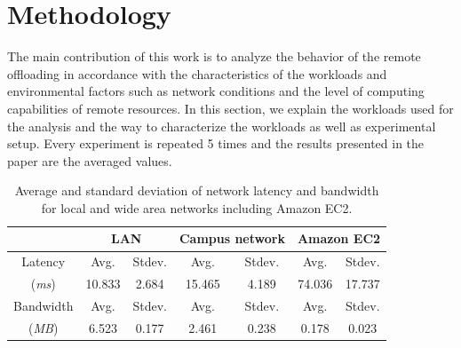 \documentclass[conference]{IEEEtran}
\begin{document}
\section{Methodology}
The main contribution of this work is to analyze the behavior of the
remote offloading in accordance with the characteristics of the
workloads and environmental factors such as network conditions and the
level of computing capabilities of remote resources.
%
In this section, we explain the workloads used for the analysis and the
way to characterize the workloads as well as experimental setup.
%
Every experiment is repeated 5 times and the results presented in the
paper are the averaged values.
%
\begin{table}
\centering
\caption{Average and standard deviation of network latency and bandwidth
for local and wide area networks including Amazon EC2.}
	\begin{tabular}{c|cc|cc|cc}
	\hline\hline
	\ & \multicolumn{2}{c|}{LAN} & \multicolumn{2}{c|}{Campus network} &
\multicolumn{2}{c}{Amazon EC2} \\
	\hline\hline
	Latency & Avg. & Stdev. & Avg. & Stdev. & Avg. & Stdev.\\
	(\textit{ms}) & 10.833 & 2.684 & 15.465 & 4.189 & 74.036 & 17.737 \\
	\hline 
	Bandwidth & Avg. & Stdev. & Avg. & Stdev. & Avg. & Stdev. \\
    (\textit{MB}) & 6.523 & 0.177 & 2.461 & 0.238 & 0.178 & 0.023 \\ \hline
	\end{tabular}
\end{table}
%
\end{document}
